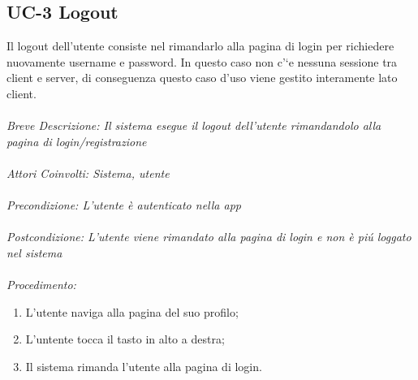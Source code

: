 \subsection{UC-3 Logout}
Il logout dell’utente consiste nel rimandarlo alla pagina di login per richiedere nuovamente username e password. In questo caso non c’`e nessuna sessione tra client e server, di conseguenza questo caso d’uso viene gestito interamente lato client.\\
\\
\textit{Breve Descrizione: Il sistema esegue il logout dell'utente rimandandolo alla pagina di login/registrazione} 
\\
\\
\textit{Attori Coinvolti: Sistema, utente}
\\
\\
\textit{Precondizione: L'utente è autenticato nella app}
\\
\\
\textit{Postcondizione: L'utente viene rimandato alla pagina di login e non è piú loggato nel sistema}
\\
\\
\textit{Procedimento:}
\begin{enumerate}
	\item L'utente naviga alla pagina del suo profilo;
	\item L'untente tocca il tasto in alto a destra;
	\item Il sistema rimanda l'utente alla pagina di login.
\end{enumerate}